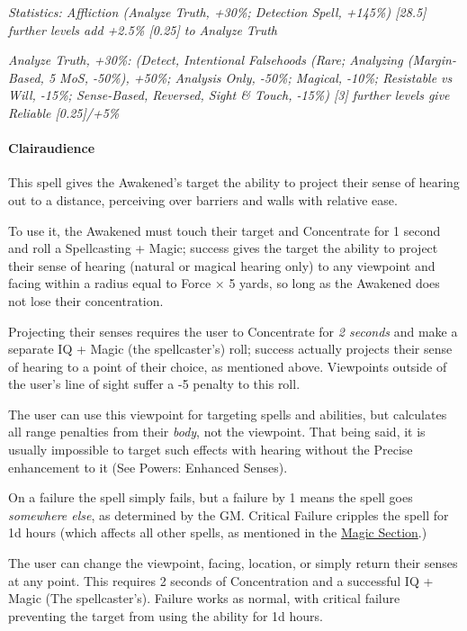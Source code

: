 \begin{multicols}{3}
	\textcolor{OliveGreen}{\textit{ Statistics: Affliction (Analyze Truth, +30\%; Detection Spell, +145\%) [28.5] further levels add +2.5\% [0.25] to Analyze Truth}}
	
	\textcolor{OliveGreen}{\textit{Analyze Truth, +30\%: (Detect, Intentional Falsehoods (Rare; Analyzing (Margin-Based, 5 MoS, -50\%), +50\%; Analysis Only, -50\%; Magical, -10\%; Resistable vs Will, -15\%; Sense-Based, Reversed, Sight \& Touch, -15\%) [3] further levels give Reliable [0.25]/+5\%}}
	
	\paragraph{Clairaudience}
		
	This spell gives the Awakened's target the ability to project their sense of hearing out to a distance, perceiving over barriers and walls with relative ease.
	
	To use it, the Awakened must touch their target and Concentrate for 1 second and roll a Spellcasting + Magic; success gives the target the ability to project their sense of hearing (natural or magical hearing only) to any viewpoint and facing within a radius equal to Force $\times$ 5 yards, so long as the Awakened does not lose their concentration. 
	
	Projecting their senses requires the user to Concentrate for \textit{2 seconds} and make a separate IQ + Magic (the spellcaster's) roll; success actually projects their sense of hearing to a point of their choice, as mentioned above. Viewpoints outside of the user's line of sight suffer a -5 penalty to this roll.
	
	The user can use this viewpoint for targeting spells and abilities, but calculates all range penalties from their \textit{body}, not the viewpoint. That being said, it is usually impossible to target such effects with hearing without the Precise enhancement to it (See Powers: Enhanced Senses).
	
	On a failure the spell simply fails, but a failure by 1 means the spell goes \textit{somewhere else}, as determined by the GM. Critical Failure cripples the spell for 1d hours (which affects all other spells, as mentioned in the \hyperref[magic]{Magic Section}.)
	
	The user can change the viewpoint, facing, location, or simply return their senses at any point. This requires 2 seconds of Concentration and a successful IQ + Magic (The spellcaster's). Failure works as normal, with critical failure preventing the target from using the ability for 1d hours.
	

\end{multicols}
